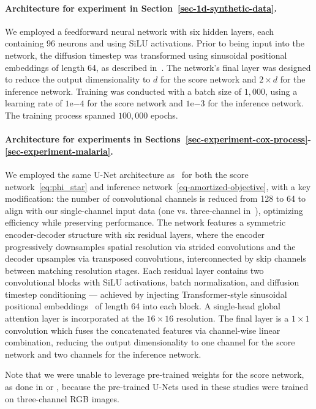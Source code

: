 \paragraph{Architecture for experiment in Section~\ref{sec-1d-synthetic-data}.}
We employed a feedforward neural network with six hidden layers, each containing 96 neurons and using SiLU activations. Prior to being input into the network, the diffusion timestep was transformed using sinusoidal positional embeddings of length 64, as described in~\citet{Vaswani2017}.
The network’s final layer was designed to reduce the output dimensionality to $d$ for the score network and $2\times d$ for the inference network. Training was conducted with a batch size of $1,000$, using a learning rate of 
$1\text{e}{-4}$ for the score network and $1\text{e}{-3}$ for the inference network. The training process spanned $100,000$ epochs.


\paragraph{Architecture for experiments in Sections~\ref{sec-experiment-cox-process}-\ref{sec-experiment-malaria}.}
We employed the same U-Net architecture as~\citet{ho_denoising} for both the score network~\eqref{eq:phi_star} and inference network~\eqref{eq-amortized-objective}, with a key modification: the number of convolutional channels is reduced from 128 to 64 to align with our single-channel input data (one vs. three-channel in~\citet{ho_denoising}), optimizing efficiency while preserving performance. The network features a symmetric encoder-decoder structure with six residual layers, where the encoder progressively downsamples spatial resolution via strided convolutions and the decoder upsamples via transposed convolutions, interconnected by skip channels between matching resolution stages. Each residual layer contains two convolutional blocks with SiLU activations, batch normalization, and diffusion timestep conditioning --- achieved by injecting Transformer-style sinusoidal positional embeddings~\citep{Vaswani2017} of length 64 into each block. A single-head global attention layer is incorporated at the $16\times16$ resolution. 
The final layer is a $1\times1$ convolution which fuses the concatenated features via channel-wise linear combination, reducing the output dimensionality to one channel for the score network and two channels for the inference network. 

Note that we were unable to leverage pre-trained weights for the score network, as done in \citet{chung2023} or \citet{boys2024}, because the pre-trained U-Nets used in these studies were trained on three-channel RGB images.

